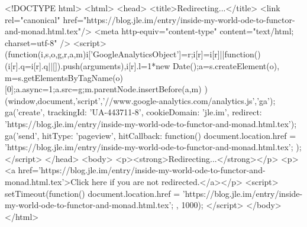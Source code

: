 <!DOCTYPE html>
<html>
<head>
<title>Redirecting...</title>
<link rel="canonical" href="https://blog.jle.im/entry/inside-my-world-ode-to-functor-and-monad.html.tex"/>
<meta http-equiv="content-type" content="text/html; charset=utf-8" />
<script>
(function(i,s,o,g,r,a,m){i['GoogleAnalyticsObject']=r;i[r]=i[r]||function(){
(i[r].q=i[r].q||[]).push(arguments)},i[r].l=1*new Date();a=s.createElement(o),
m=s.getElementsByTagName(o)[0];a.async=1;a.src=g;m.parentNode.insertBefore(a,m)
})(window,document,'script','//www.google-analytics.com/analytics.js','ga');
ga('create', { trackingId: 'UA-443711-8', cookieDomain: 'jle.im', redirect: 'https://blog.jle.im/entry/inside-my-world-ode-to-functor-and-monad.html.tex'});
ga('send', { hitType: 'pageview', hitCallback: function() { document.location.href = 'https://blog.jle.im/entry/inside-my-world-ode-to-functor-and-monad.html.tex'; } });
</script>
</head>
<body>
  <p><strong>Redirecting...</strong></p>
  <p><a href='https://blog.jle.im/entry/inside-my-world-ode-to-functor-and-monad.html.tex'>Click here if you are not redirected.</a></p>
  <script>
    setTimeout(function() { document.location.href = 'https://blog.jle.im/entry/inside-my-world-ode-to-functor-and-monad.html.tex'; }, 1000);
  </script>
</body>
</html>

